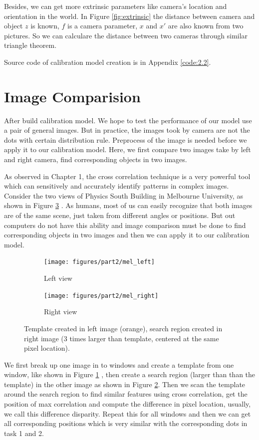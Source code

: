 Besides, we can get more extrinsic parameters like camera's location and orientation in the world. In Figure \ref{fig:extrinsic} the distance between camera and object $z$ is known, $f$ is a camera parameter, $x$ and $x'$ are also known from two pictures. So we can calculare the distance between two cameras through similar triangle theorem.

Source code of calibration model creation is in Appendix \ref{code:2.2}.

\section{Image Comparision}

After build calibration model. We hope to test the performance of our model use a pair of general images. But in practice, the images took by camera are not the dots with certain distribution rule. Preprocess of the image is needed before we apply it to our calibration model. Here, we first compare two images take by left and right camera, find corresponding objects in two images.

As observed in Chapter 1, the cross correlation technique is a very powerful tool which can sensitively and accurately identify patterns in complex images. Consider the two views of Physics South Building in Melbourne University, as shown in Figure \ref{fig:mel} . As humans, most of us can easily recognize that both images are of the same scene, just taken from different angles or positions. But out computers do not have this ability and image comparison must be done to find corresponding objects in two images and then we can apply it to our calibration model.

\begin{figure}[h!]
	\centering
	\begin{subfigure}[t]{0.48\linewidth}
		\centering
		\texttt{[image: figures/part2/mel\_left]}
		\caption{Left view}
		\label{fig:mel_left}
	\end{subfigure}
	\begin{subfigure}[t]{0.48\linewidth}
		\centering
		\texttt{[image: figures/part2/mel\_right]}
		\caption{Right view}
		\label{fig:mel_right}
	\end{subfigure}
	\caption{Template created in left image (orange), search region created in right image (3 times larger than template, centered at the same pixel location).}
	\label{fig:mel}
\end{figure}

We first break up one image in to windows and create a template from one window, like shown in Figure \ref{fig:mel_left} , then create a search region (larger than than the template) in the other image as shown in Figure \ref{fig:mel_right}. Then we scan the template around the search region to find similar features using cross correlation, get the position of max correlation and compute the difference in pixel location, usually, we call this difference disparity. Repeat this for all windows and then we can get all corresponding positions which is very similar with the corresponding dots in task 1 and 2.

